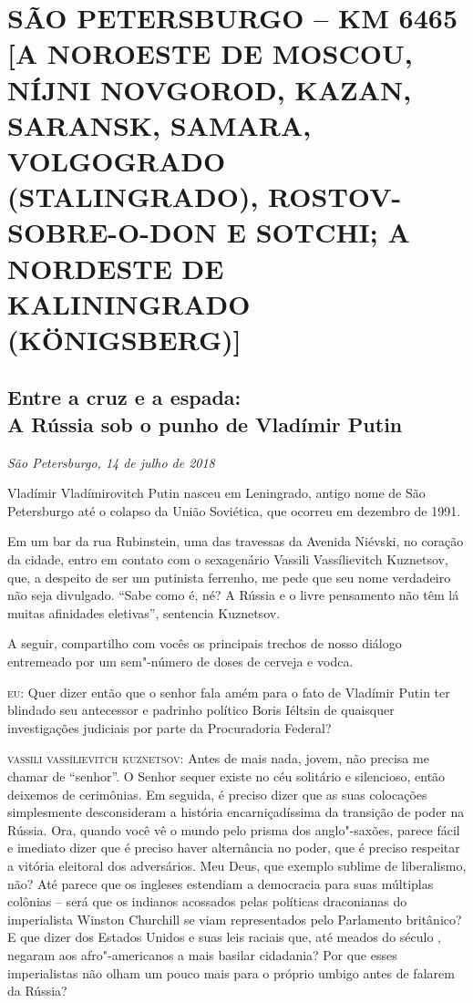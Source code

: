 \part*{SÃO PETERSBURGO -- KM 6465\\{[}A NOROESTE DE MOSCOU, NÍJNI NOVGOROD, KAZAN, SARANSK, SAMARA,
VOLGOGRADO (STALINGRADO), ROSTOV-SOBRE-O-DON E SOTCHI; A NORDESTE DE KALININGRADO (KÖNIGSBERG){]}}


\chapter*{Entre a cruz e a espada:\\A Rússia sob o punho de Vladímir Putin}

\begin{flushright}
\emph{São Petersburgo, 14 de julho de 2018}
\end{flushright}

Vladímir Vladímirovitch Putin nasceu em Leningrado, antigo nome de São
Petersburgo até o colapso da União Soviética, que ocorreu em dezembro de
1991.

Em um bar da rua Rubinstein, uma das travessas da Avenida Niévski, no
coração da cidade, entro em contato com o sexagenário Vassili
Vassílievitch Kuznetsov, que, a despeito de ser um putinista ferrenho,
me pede que seu nome verdadeiro não seja divulgado. ``Sabe como é, né? A
Rússia e o livre pensamento não têm lá muitas afinidades eletivas'',
sentencia Kuznetsov.

A seguir, compartilho com vocês os principais trechos de nosso diálogo
entremeado por um sem"-número de doses de cerveja e vodca.

\textsc{eu:} Quer dizer então que o senhor fala amém para o fato de
Vladímir Putin ter blindado seu antecessor e padrinho político Boris
Iéltsin de quaisquer investigações judiciais por parte da Procuradoria
Federal?

\textsc{vassili vassílievitch kuznetsov:} Antes de mais nada, jovem, não
precisa me chamar de ``senhor''. O Senhor sequer existe no céu solitário
e silencioso, então deixemos de cerimônias. Em seguida, é preciso dizer
que as suas colocações simplesmente desconsideram a história
encarniçadíssima da transição de poder na Rússia. Ora, quando você vê o
mundo pelo prisma dos anglo"-saxões, parece fácil e imediato dizer que é
preciso haver alternância no poder, que é preciso respeitar a vitória
eleitoral dos adversários. Meu Deus, que exemplo sublime de liberalismo,
não? Até parece que os ingleses estendiam a democracia para suas
múltiplas colônias -- será que os indianos acossados pelas políticas
draconianas do imperialista Winston Churchill se viam representados pelo
Parlamento britânico? E que dizer dos Estados Unidos e suas leis raciais
que, até meados do século , negaram aos afro"-americanos a mais basilar
cidadania? Por que esses imperialistas não olham um pouco mais para o
próprio umbigo antes de falarem da Rússia?

